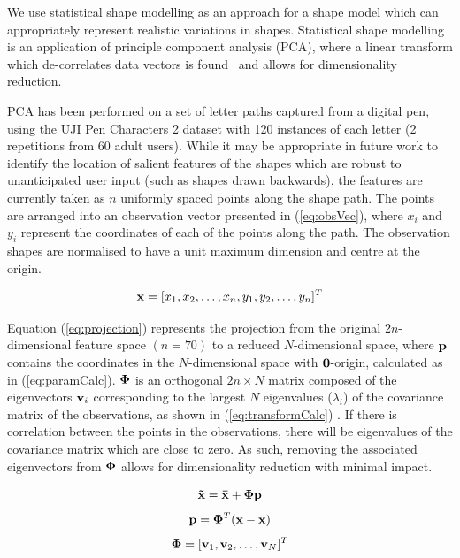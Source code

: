 \documentclass{sig-alternate}
\begin{document}
We use statistical shape modelling as an approach for a shape model which can
appropriately represent realistic variations in shapes. Statistical shape
modelling is an application of principle component analysis (PCA), where a
linear transform which de-correlates data vectors is found~\cite{Stegmann2002}
and allows for dimensionality reduction. 

PCA has been performed on a set of letter paths captured from a digital pen,
using the UJI Pen Characters 2 dataset \cite{Llorens2008} with 120 instances of
each letter (2 repetitions from 60 adult users). While it may be appropriate in future work to
identify the location of salient features of the shapes which are robust to 
unanticipated user input (such as shapes drawn backwards),
the features are currently taken as $n$ uniformly spaced points along the shape
path. The
points are arranged into an observation vector presented in (\ref{eq:obsVec}),
where $x_i$ and $y_i$ represent the coordinates of each of the points along the
path. The observation shapes are normalised to have a unit maximum dimension 
and centre at the origin.

\begin{equation}\label{eq:obsVec}
{\bf x} = [x_1, x_2, \ldots, x_n, y_1, y_2, \ldots, y_n]^T
\end{equation}

Equation (\ref{eq:projection}) represents the projection from the original 
$2n$-dimensional feature space $(n=70)$ to a reduced $N$-dimensional space, where ${\bf p}$
contains the coordinates in the $N$-dimensional space with ${\bf 0}$-origin,
calculated as in (\ref{eq:paramCalc}). 
${\bf \Phi }$ is
an orthogonal $2n\times N$ matrix composed of the eigenvectors ${\bf v}_i$ corresponding to
the largest $N$ eigenvalues ($\lambda_i$) of the covariance matrix of the
observations, as shown in (\ref{eq:transformCalc}) \cite{Stegmann2002}. 
If there is correlation between the points in the observations, there will be
eigenvalues of the covariance matrix which are close to zero. As such, removing
the associated eigenvectors from ${\bf \Phi}$ allows for dimensionality
reduction with minimal impact.


\begin{equation}\label{eq:projection}
{\bf \tilde{x}=\bar{x}+\Phi p}
\end{equation}
\begin{equation}\label{eq:paramCalc}
{\bf p} ={\bf \Phi}^T ({\bf {x}-\bar{x}})
\end{equation}
\begin{equation}\label{eq:transformCalc}
{\bf \Phi} = [{\bf v}_1, {\bf v}_2, \ldots, {\bf v}_N]^T
\end{equation}
\end{document}
